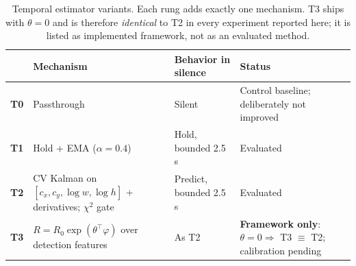 \begin{table}[t]
\centering
\caption{Temporal estimator variants. Each rung adds exactly one mechanism.
T3 ships with $\theta=0$ and is therefore \emph{identical} to T2 in every
experiment reported here; it is listed as implemented framework, not as an
evaluated method.}
\label{tab:estimators}
\footnotesize
\setlength{\tabcolsep}{3pt}
\renewcommand{\arraystretch}{1.2}
\begin{tabular}{@{}l p{20mm} p{17mm} p{22mm}@{}}
\toprule
& \textbf{Mechanism} & \textbf{Behavior in silence} & \textbf{Status} \\
\midrule
\textbf{T0} & Passthrough              & Silent            & Control baseline; deliberately not improved \\
\textbf{T1} & Hold + EMA ($\alpha=0.4$)& Hold, bounded 2.5\,s & Evaluated \\
\textbf{T2} & CV Kalman on $[c_x,c_y,\log w,\log h]$ + derivatives; $\chi^2$ gate & Predict, bounded 2.5\,s & Evaluated \\
\textbf{T3} & $R = R_0\exp(\theta^\top\varphi)$ over detection features & As T2 & \textbf{Framework only}: $\theta=0 \Rightarrow$ T3 $\equiv$ T2; calibration pending \\
\bottomrule
\end{tabular}
\end{table}

